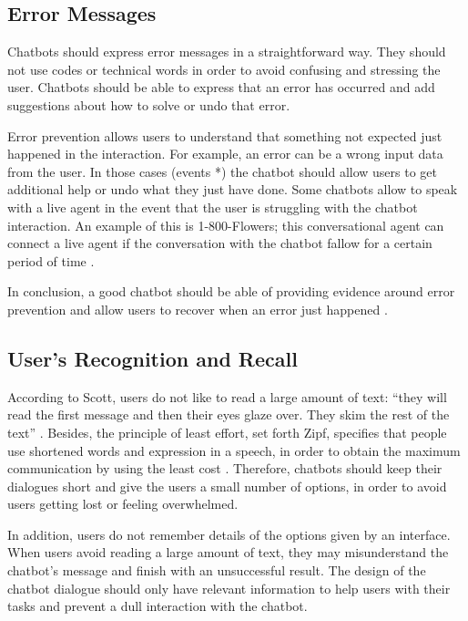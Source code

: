 \documentclass[a4paper,10pt]{article}
\begin{document}
\subsection*{Error Messages}

Chatbots should express error messages in a straightforward way. They should not use codes or technical words in order to avoid confusing and stressing the user. Chatbots should be able to express that an error has occurred and add suggestions about how to solve or undo that error. 

Error prevention allows users to understand that something not expected just happened in the interaction. For example, an error can be a wrong input data from the user. In those cases (events *) the chatbot should allow users to get additional help or undo what they just have done. Some chatbots  allow to speak with a live agent in the event that the user is struggling with the chatbot interaction. An example of this is 1-800-Flowers; this conversational agent can connect a live agent if the conversation with the chatbot fallow for a certain period of time \cite{1-800-Flowers}. 

In conclusion, a good chatbot should be able of providing evidence around error prevention and allow users to recover when an error just happened \cite{HeuristicsWebPage}. 

\subsection*{User's Recognition and Recall}

According to Scott, users do not like to read a large amount of text: ``they will read the first message and then their eyes glaze over. They skim the rest of the text” \cite{HeuristicsWebPage}. Besides, the principle of least effort, set forth Zipf, specifies that people use shortened words and expression in a speech, in order to obtain the maximum communication by using the least cost \cite{allen1978conversation}. Therefore, chatbots should keep their dialogues short and give the users a small number of options, in order to avoid users getting lost or feeling overwhelmed.

In addition, users do not remember details of the options given by an interface. When users avoid reading a large amount of text, they may misunderstand the chatbot’s message and finish with an unsuccessful result. The design of the chatbot dialogue should only have relevant information to help users with their tasks and prevent a dull interaction with the chatbot. 
\end{document}
